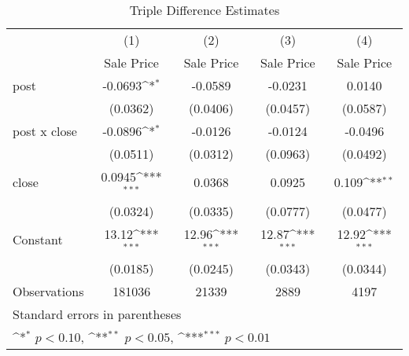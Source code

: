 \begin{table}[htbp]\centering
\def\sym#1{\ifmmode^{#1}\else\(^{#1}\)\fi}
\caption{Triple Difference Estimates\label{tabl}}
\begin{tabular}{l*{4}{c}}
\hline\hline
                    &\multicolumn{1}{c}{(1)}&\multicolumn{1}{c}{(2)}&\multicolumn{1}{c}{(3)}&\multicolumn{1}{c}{(4)}\\
                    &\multicolumn{1}{c}{Sale Price}&\multicolumn{1}{c}{Sale Price}&\multicolumn{1}{c}{Sale Price}&\multicolumn{1}{c}{Sale Price}\\
\hline
post                &     -0.0693\sym{*}  &     -0.0589         &     -0.0231         &      0.0140         \\
                    &    (0.0362)         &    (0.0406)         &    (0.0457)         &    (0.0587)         \\
[1em]
post x close        &     -0.0896\sym{*}  &     -0.0126         &     -0.0124         &     -0.0496         \\
                    &    (0.0511)         &    (0.0312)         &    (0.0963)         &    (0.0492)         \\
[1em]
close               &      0.0945\sym{***}&      0.0368         &      0.0925         &       0.109\sym{**} \\
                    &    (0.0324)         &    (0.0335)         &    (0.0777)         &    (0.0477)         \\
[1em]
Constant            &       13.12\sym{***}&       12.96\sym{***}&       12.87\sym{***}&       12.92\sym{***}\\
                    &    (0.0185)         &    (0.0245)         &    (0.0343)         &    (0.0344)         \\
\hline
Observations        &      181036         &       21339         &        2889         &        4197         \\
\hline\hline
\multicolumn{5}{l}{\footnotesize Standard errors in parentheses}\\
\multicolumn{5}{l}{\footnotesize \sym{*} \(p<0.10\), \sym{**} \(p<0.05\), \sym{***} \(p<0.01\)}\\
\end{tabular}
\end{table}
